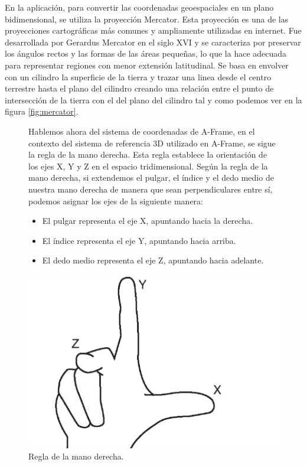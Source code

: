 \documentclass[a4paper, 11pt]{book}
\begin{document}
En la aplicación, para convertir las coordenadas geoespaciales en un plano bidimensional, se utiliza la proyección Mercator. Esta proyección es una de las proyecciones cartográficas más comunes y ampliamente utilizadas en internet. Fue desarrollada por Gerardus Mercator en el siglo XVI y se caracteriza por preservar los ángulos rectos y las formas de las áreas pequeñas, lo que la hace adecuada para representar regiones con menor extensión latitudinal. 
Se basa en envolver con un cilindro la superficie de la tierra y trazar una linea desde el centro terrestre hasta el plano del cilindro creando una relación entre el punto de intersección de la tierra con el del plano del cilindro tal y como podemos ver en la figura \ref{fig:mercator}.
\begin{figure}[H]
\begin{minipage}{0.7\textwidth}
Hablemos ahora del sistema de coordenadas de A-Frame, en el contexto del sistema de referencia 3D utilizado en A-Frame, se sigue la regla de la mano derecha. Esta regla establece la orientación de los ejes X, Y y Z en el espacio tridimensional.
Según la regla de la mano derecha, si extendemos el pulgar, el índice y el dedo medio de nuestra mano derecha de manera que sean perpendiculares entre sí, podemos asignar los ejes de la siguiente manera:
\begin{itemize}
    \item El pulgar representa el eje X, apuntando hacia la derecha.
    \item El índice representa el eje Y, apuntando hacia arriba.
    \item El dedo medio representa el eje Z, apuntando hacia adelante.
    
\end{itemize}
\end{minipage}
\hfill
\begin{minipage}{0.25\textwidth}
\includegraphics[width=\textwidth]{img/rightHand.jpg}
\caption{Regla de la mano derecha.}
\label{fig:rightHand}
\end{minipage}
\end{figure}
\end{document}
